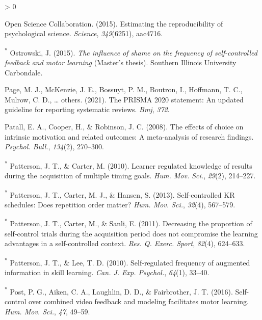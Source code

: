 \documentclass[
  english,
  man,floatsintext]{apa7}
\newlength{\cslhangindent}
\newenvironment{CSLReferences}[2] %
 {%
  \setlength{\parindent}{0pt}
  \ifodd #1 \everypar{\setlength{\hangindent}{\cslhangindent}}\ignorespaces\fi
  \ifnum #2 > 0
  \setlength{\parskip}{#2\baselineskip}
  \fi
 }%
 {}
\begin{document}
\begin{CSLReferences}{1}{0}
\leavevmode\hypertarget{ref-Open_Science_Collaboration2015-ay}{}%
Open Science Collaboration. (2015). Estimating the reproducibility of psychological science. \emph{Science}, \emph{349}(6251), aac4716.

\leavevmode\hypertarget{ref-Ostrowski2015-nb}{}%
\textsuperscript{*} Ostrowski, J. (2015). \emph{The influence of shame on the frequency of self-controlled feedback and motor learning} (Master's thesis). Southern Illinois University Carbondale.

\leavevmode\hypertarget{ref-page2021}{}%
Page, M. J., McKenzie, J. E., Bossuyt, P. M., Boutron, I., Hoffmann, T. C., Mulrow, C. D., \ldots{} others. (2021). The PRISMA 2020 statement: An updated guideline for reporting systematic reviews. \emph{Bmj}, \emph{372}.

\leavevmode\hypertarget{ref-Patall2008-oy}{}%
Patall, E. A., Cooper, H., \& Robinson, J. C. (2008). The effects of choice on intrinsic motivation and related outcomes: A meta-analysis of research findings. \emph{Psychol. Bull.}, \emph{134}(2), 270--300.

\leavevmode\hypertarget{ref-Patterson2010-tk}{}%
\textsuperscript{*} Patterson, J. T., \& Carter, M. (2010). Learner regulated knowledge of results during the acquisition of multiple timing goals. \emph{Hum. Mov. Sci.}, \emph{29}(2), 214--227.

\leavevmode\hypertarget{ref-Patterson2013-nh}{}%
\textsuperscript{*} Patterson, J. T., Carter, M. J., \& Hansen, S. (2013). Self-controlled {KR} schedules: Does repetition order matter? \emph{Hum. Mov. Sci.}, \emph{32}(4), 567--579.

\leavevmode\hypertarget{ref-Patterson2011-vt}{}%
\textsuperscript{*} Patterson, J. T., Carter, M., \& Sanli, E. (2011). Decreasing the proportion of self-control trials during the acquisition period does not compromise the learning advantages in a self-controlled context. \emph{Res. Q. Exerc. Sport}, \emph{82}(4), 624--633.

\leavevmode\hypertarget{ref-Patterson2010-uu}{}%
\textsuperscript{*} Patterson, J. T., \& Lee, T. D. (2010). Self-regulated frequency of augmented information in skill learning. \emph{Can. J. Exp. Psychol.}, \emph{64}(1), 33--40.

\leavevmode\hypertarget{ref-Post2016-vg}{}%
\textsuperscript{*} Post, P. G., Aiken, C. A., Laughlin, D. D., \& Fairbrother, J. T. (2016). Self-control over combined video feedback and modeling facilitates motor learning. \emph{Hum. Mov. Sci.}, \emph{47}, 49--59.


\end{CSLReferences}
\end{document}
